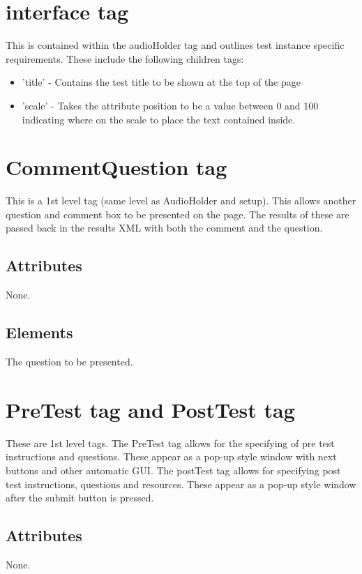 \documentclass{article}
\begin{document}
\section{interface tag}

This is contained within the audioHolder tag and outlines test instance specific requirements. These include the following children tags:
\begin{itemize}
\item 'title' - Contains the test title to be shown at the top of the page
\item 'scale' - Takes the attribute position to be a value between 0 and 100 indicating where on the scale to place the text contained inside.
\end{itemize}

\section {CommentQuestion tag}

This is a 1st level tag (same level as AudioHolder and setup). This allows another question and comment box to be presented on the page. The results of these are passed back in the results XML with both the comment and the question.

\subsection{Attributes}
None.

\subsection{Elements}
The question to be presented.

\section {PreTest tag and PostTest tag}

These are 1st level tags. The PreTest tag allows for the specifying of pre test instructions and questions. These appear as a pop-up style window with next buttons and other automatic GUI. The postTest tag allows for specifying post test instructions, questions and resources. These appear as a pop-up style window after the submit button is pressed.

\subsection{Attributes}
None.
\end{document}
